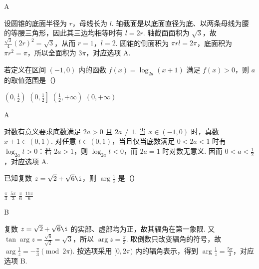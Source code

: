 \begin{answer}
A
\end{answer}

\begin{solution}
设圆锥的底面半径为 \(r\)，母线长为 \(l\). 轴截面是以底面直径为底、以两条母线为腰的等腰三角形，因此其三边均相等时有 \(l=2r\). 轴截面面积为 \(\sqrt{3}\)，故
\(\frac{\sqrt{3}}{4}(2r)^2=\sqrt{3}\)，从而 \(r=1\)，\(l=2\). 圆锥的侧面积为 \(\pi rl=2\pi\)，底面积为 \(\pi r^2=\pi\)，所以全面积为 \(3\pi\)，对应选项 A.
\end{solution}

\begin{problem}
若定义在区间 \((-1,0)\) 内的函数 \(f(x) = \log_{2a}(x + 1)\) 满足 \(f(x) > 0\)，则 \(a\) 的取值范围是（\quad）

\choices
    {\(\left(0, \frac{1}{2}\right)\)}
    {\(\left(0, \frac{1}{2}\right]\)}
    {\(\left(\frac{1}{2},+\infty\right)\)}
    {\((0, +\infty)\)}
\end{problem}

\begin{answer}
A
\end{answer}

\begin{solution}
对数有意义要求底数满足 \(2a>0\) 且 \(2a\ne1\). 当 \(x\in(-1,0)\) 时，真数 \(x+1\in(0,1)\). 对任意 \(t\in(0,1)\)，当且仅当底数满足 \(0<2a<1\) 时有 \(\log_{2a}t>0\)：若 \(2a>1\)，则 \(\log_{2a}t<0\)，而 \(2a=1\) 时对数无意义. 因而 \(0<a<\frac12\)，对应选项 A.
\end{solution}

\begin{problem}
已知复数 \(z = \sqrt{2} + \sqrt{6}\i\)，则 \(\arg \frac{1}{z}\) 是（\quad）

\choices
    {\(\frac{\pi}{3}\)}
    {\(\frac{5\pi}{3}\)}
    {\(\frac{\pi}{6}\)}
    {\(\frac{11\pi}{6}\)}
\end{problem}

\begin{answer}
B
\end{answer}

\begin{solution}
复数 \(z=\sqrt{2}+\sqrt{6}\i\) 的实部、虚部均为正，故其辐角在第一象限. 又
\(\tan\arg z=\frac{\sqrt{6}}{\sqrt{2}}=\sqrt{3}\)，所以 \(\arg z=\frac{\pi}{3}\). 取倒数只改变辐角的符号，故 \(\arg\frac{1}{z}=-\frac{\pi}{3}\pmod{2\pi}\). 按选项采用 \([0,2\pi)\) 内的辐角表示，得到 \(\arg\frac{1}{z}=\frac{5\pi}{3}\)，对应选项 B.
\end{solution}

